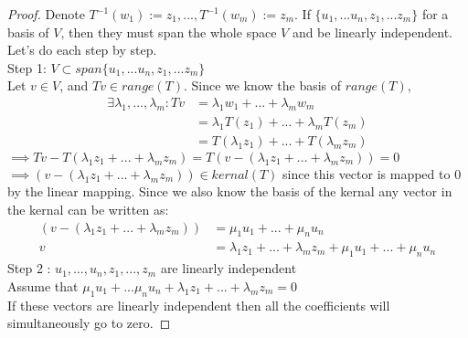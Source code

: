 \begin{proof}
	Denote $T^{-1}(w_1) := z_1,...,T^{-1}(w_m) := z_m$. If $\{u_1,...u_n,z_1,...z_m\}$ for a basis of $V$, then they must span the whole space $V$ and be linearly independent. Let's do each step by step. \\
	Step 1: $V \subset span\{u_1,...u_n,z_1,...z_m\}$ \\ 
	Let $v \in V$, and $Tv \in range(T)$. Since we know the basis of $range(T)$,
	\begin{align*}
		\exists \lambda_1,...,\lambda_m: Tv &= \lambda_1 w_1 + ... + \lambda_m w_m \\
											&= \lambda_1 T(z_1) + ... + \lambda_m T(z_m) \\
											&= T(\lambda_1 z_1) + ... + T(\lambda_m z_m)
	\end{align*}
$ \implies Tv - T(\lambda_1z_1 + ... + \lambda_mz_m) = T(v - (\lambda_1z_1 + ... + \lambda_mz_m)) =  0$  \\
$\implies (v - (\lambda_1z_1 + ... + \lambda_mz_m)) \in kernal(T)$ since this vector is mapped to 0 by the linear mapping. Since we also know the basis of the kernal any vector in the kernal can be written as: 
\begin{align*}
(v - (\lambda_1z_1 + ... + \lambda_mz_m)) &= \mu_1 u_1 + ... + \mu_n u_n \\ 
v &= \lambda_1 z_1 + ... + \lambda_m z_m + \mu_1 u_1 + ... + \mu_n u_n
\end{align*}
Step 2 : $u_1,...,u_n, z_1,...,z_m$ are linearly independent \\ 
Assume that $\mu_1 u_1 + ... \mu_n u_n + \lambda_1 z_1 + ... + \lambda_m z_m  = 0$ \\
If these vectors are linearly independent then all the coefficients will simultaneously go to zero. 

\end{proof}



